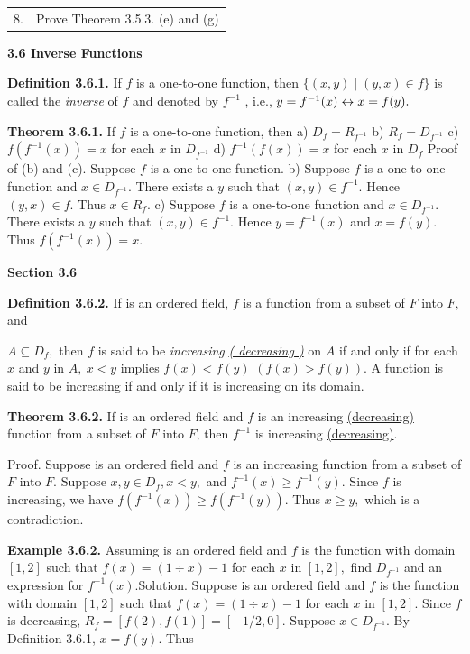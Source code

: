 \begin{large}
\begin{tabular}{l l}
8.& 	Prove Theorem 3.5.3. (e) and (g) \\
\end{tabular}\nl
\vfill
\textbf{3.6 Inverse Functions}\nl
{}

\textbf{Definition 3.6.1.} If $f$ is a one-to-one function, then $\{(x,y) \mid (y,x) \in f\}$ is called the \textit{inverse} of $f$ and denoted by $f^{-1}$ , i.e., $y= f^{-1}(x) \leftrightarrow x =f(y).$\nl

\textbf{Theorem 3.6.1.} If $f$ is a one-to-one function, then\nl
a) $D_f  =R_{f^{-1}}$\nl
b) $R_{f} =D_{f^{-1}} $\nl
c) $f(f^{-1}(x)) = x$ for each $x$ in $D_{f^{-1}}$\nl
d) $f^{-1}(f(x)) = x$ for each $x$ in $D_{f}$\nl
Proof of (b) and (c).  Suppose $f$ is a one-to-one function. \nl
b) Suppose $f$ is a one-to-one function and $x\in D_{f^{-1}}$. There exists a $y$ such that $(x,y)\in f^{-1}.$ Hence $(y,x)\in f.$ Thus $x\in R_{f}.$\nl
c) Suppose $f$ is a one-to-one function and $x\in D_{f^{-1}}.$ There exists a $y$ such that $(x,y)\in f^{-1}.$  Hence $y = f^{-1}(x)$ and $x = f(y).$ Thus $f(f^{-1}(x))=x.$\nl

\newpage



\textbf{Section 3.6 }\nl

\textbf{Definition 3.6.2.} If \of  is an ordered field, $f$ is a function from a subset of $F$ into $F,$ and

$A\subseteq D_{f},$ then $f$ is said to be \textit{increasing}  \underline{\textit{( decreasing )}} on $A$ if and only if for each $x$ and $y$ in $A,~x < y$ implies $f(x) < f(y)$ \underline{$(f(x) >f(y))$}. A function is said to be increasing if and only if it is increasing on its domain. \nl

\textbf{Theorem 3.6.2.} If \of  is an ordered field and $f $ is an increasing
\underline{(decreasing)} function from a subset of $F$ into $F$,  then $f^{-1}$ is increasing \underline{(decreasing)}. \nl

Proof. Suppose \of is an ordered field and $f$ is an increasing function from a subset of $F$ into
$F.$  Suppose  $x,y \in D_{f}, x<y,$ and $f^{-1}(x) \geq f^{-1}(y).$
Since $f$ is increasing, we have $f( f^{-1}(x)) \geq f( f^{-1}(y) )$. Thus $x \geq y,$ which is
a contradiction. \nl


\textbf{Example 3.6.2.} Assuming \of  is an ordered field and $f$ is the function with domain $[1,2]$
such that $f(x) =(1\div x)- 1$ for each $x$ in $[1,2],$ find $D_{f^{-1}}$ and an expression for $f^{-1}(x).$\nl Solution.  Suppose \of  is an ordered field and $f$ is the function with domain $[1,2]$ such that $f(x) =(1\div x)- 1$ for each $x$ in $[1,2].$ Since $f$ is de­creasing,  $R_{f} = [f(2) ,f(1)] = [-1/2, 0].$ Suppose $x \in D_{f^{-1}}.$  By Definition 3.6.1, $x = f(y).$  Thus\nl


\end{large}
